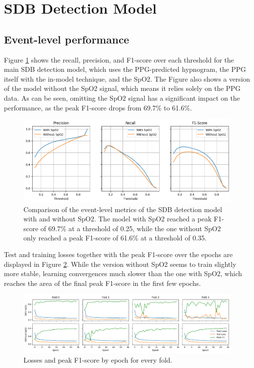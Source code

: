 \section{SDB Detection Model}

\subsection*{Event-level performance}

Figure \ref{fig:event-metrics} shows the recall, precision, and F1-score over each threshold for the main SDB detection model, which uses the PPG-predicted hypnogram, the PPG itself with the in-model technique, and the SpO2. The Figure also shows a version of the model without the SpO2 signal, which means it relies solely on the PPG data. As can be seen, omitting the SpO2 signal has a significant impact on the performance, as the peak F1-score drops from 69.7\% to 61.6\%.

\begin{figure}
    \centering
    \includegraphics[width=\textwidth]{images/DetectionModelEventMetrics}
    \caption{Comparison of the event-level metrics of the SDB detection model with and without SpO2. The model with SpO2 reached a peak F1-score of 69.7\% at a threshold of 0.25, while the one without SpO2 only reached a peak F1-score of 61.6\% at a threshold of 0.35.}
    \label{fig:event-metrics}
\end{figure}

Test and training losses together with the peak F1-score over the epochs are displayed in Figure \ref{fig:event-epoch-losses}. While the version without SpO2 seems to train slightly more stable, learning convergences much slower than the one with SpO2, which reaches the area of the final peak F1-score in the first few epochs.

\begin{figure}
    \centering
    \includegraphics[width=\textwidth]{images/DetectionModelEpochLosses}
    \caption{Losses and peak F1-score by epoch for every fold.}
    \label{fig:event-epoch-losses}
\end{figure}

